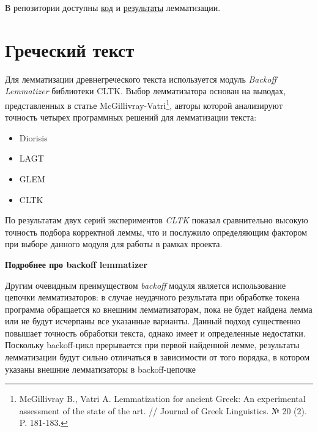 \documentclass[
  letterpaper,
]{book}
\providecommand{\tightlist}{%
  \setlength{\itemsep}{0pt}\setlength{\parskip}{0pt}}\usepackage{longtable,booktabs,array}
\begin{document}
В репозитории доступны
\href{https://github.com/Drozhzhinastya/GSPC/tree/main/scripts/lemmatization}{код}
и
\href{https://github.com/Drozhzhinastya/GSPC/tree/main/lemmatization/csl}{результаты}
лемматизации.

\hypertarget{sec-lemm_grc}{%
\section{Греческий текст}\label{sec-lemm_grc}}

Для лемматизации древнегреческого текста используется модуль
\emph{Backoff Lemmatizer} библиотеки CLTK. Выбор лемматизатора основан
на выводах, представленных в статье McGillivray-Vatri\footnote{McGillivray
  B., Vatri A. Lemmatization for ancient Greek: An experimental
  assessment of the state of the art. // Journal of Greek Linguistics. №
  20 (2). P. 181-183.}, авторы которой анализируют точность четырех
программных решений для лемматизации текста:

\begin{itemize}
\tightlist
\item
  Diorisis
\item
  LAGT
\item
  GLEM
\item
  CLTK
\end{itemize}

По результатам двух серий экспериментов \emph{CLTK} показал сравнительно
высокую точность подбора корректной леммы, что и послужило определяющим
фактором при выборе данного модуля для работы в рамках проекта.

\begin{tcolorbox}[enhanced jigsaw, toprule=.15mm, colframe=quarto-callout-note-color-frame, colback=white, left=2mm, arc=.35mm, leftrule=.75mm, bottomrule=.15mm, rightrule=.15mm, opacityback=0, breakable]

\textbf{Подробнее про backoff lemmatizer}\vspace{2mm}

Другим очевидным преимуществом \emph{backoff} модуля является
использование цепочки лемматизаторов: в случае неудачного результата при
обработке токена программа обращается ко внешним лемматизаторам, пока не
будет найдена лемма или не будут исчерпаны все указанные варианты.
Данный подход существенно повышает точность обработки текста, однако
имеет и определенные недостатки. Поскольку backoff-цикл прерывается при
первой найденной лемме, результаты лемматизации будут сильно отличаться
в зависимости от того порядка, в котором указаны внешние лемматизаторы в
backoff-цепочке

\end{tcolorbox}
\end{document}
